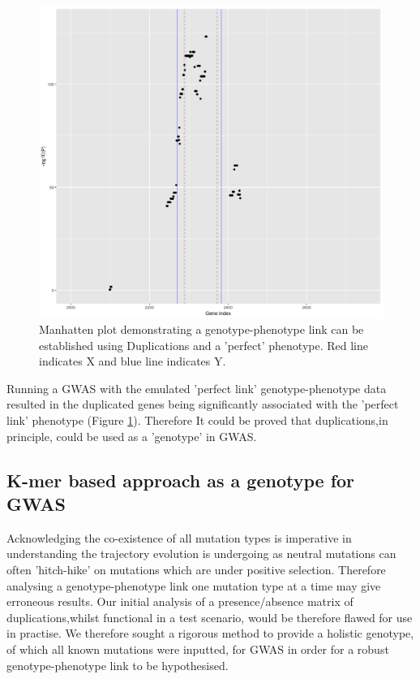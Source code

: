 \documentclass{article}
\begin{document}
\begin{figure}[h!]
\centering
\includegraphics[width=\textwidth]{just core.png}
\caption{Manhatten plot demonstrating a genotype-phenotype link can be established using Duplications and a 'perfect' phenotype. Red line indicates X and blue line indicates Y. }
\label{fig:Manhatten_1}
\end{figure}




Running a GWAS with the emulated 'perfect link' genotype-phenotype data resulted in the duplicated genes being significantly associated with the 'perfect link' phenotype (Figure \ref{fig:Manhatten_1}). Therefore It could be proved that duplications,in principle, could be used as a 'genotype' in GWAS.

\clearpage


\subsection{K-mer based approach as a genotype for GWAS}

Acknowledging the co-existence of all mutation types is imperative in understanding the trajectory evolution is undergoing as neutral mutations can often 'hitch-hike' on mutations which are under positive selection. Therefore analysing a genotype-phenotype link one mutation type at a time may give erroneous results. Our initial analysis of a presence/absence matrix of duplications,whilst functional in a test scenario, would be therefore flawed for use in practise. We therefore sought a rigorous method to provide a holistic genotype, of which all known mutations were inputted, for GWAS in order for a robust genotype-phenotype link to be hypothesised.
\end{document}
